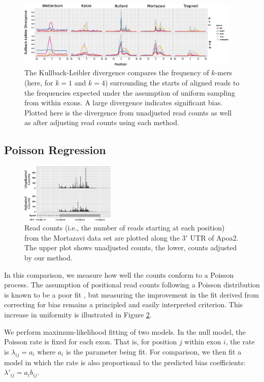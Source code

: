 \documentclass{bioinfo}
\begin{document}
\begin{figure}
\centerline{\includegraphics[width=0.95\textwidth]{kl.eps}}
\caption{The Kullback-Leibler divergence compares the frequency of $k$-mers
(here, for $k = 1$ and $k = 4$) surrounding the starts of aligned reads to the
frequencies expected under the assumption of uniform sampling from within exons.
A large divergence indicates significant bias. Plotted here is the divergence
from unadjusted read counts as well as after adjusting read counts using each
method.}
\label{fig:kl}
\end{figure}


\subsection{Poisson Regression}

\begin{figure}
\centerline{\includegraphics[width=0.4\textwidth]{uniformity.eps}}
\caption{Read counts (i.e., the number of reads starting at each position)
from the Mortazavi data set are plotted along the $3'$ UTR of Apoa2. The upper
plot shows unadjusted counts, the lower, counts adjusted by our method.}
\label{fig:unif}
\end{figure}

In this comparison, we measure how well the counts conform to a Poisson process.
The assumption of positional read counts following a Poisson distribution is
known to be a poor fit \citep{Srivastava2010}, but measuring the improvement in
the fit derived from correcting for bias remains a principled and easily
interpreted criterion. This increase in uniformity is illustrated in Figure
\ref{fig:unif}.

We perform maximum-likelihood fitting of two models. In the null model, the
Poisson rate is fixed for each exon. That is, for position $j$ within exon $i$,
the rate is $ \lambda_{ij} = a_i $ where $a_i$ is the parameter being fit. For
comparison, we then fit a model in which the rate is also proportional to the
predicted bias coefficients: $ \lambda'_{ij} = a_i b_{ij} $.
\end{document}
